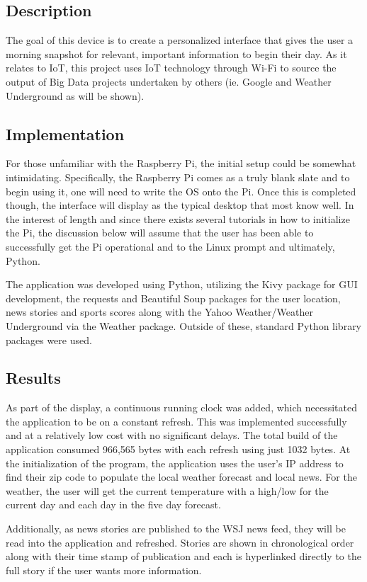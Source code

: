 \documentclass[sigconf]{acmart}
\begin{document}
\subsection{Description}
The goal of this device is to create a personalized interface that gives the user a morning snapshot for relevant, important information to begin their day. As it relates to IoT, this project uses IoT technology through Wi-Fi to source the output of Big Data projects undertaken by others (ie. Google and Weather Underground as will be shown).

\subsection{Implementation}
For those unfamiliar with the Raspberry Pi, the initial setup could be somewhat intimidating. Specifically, the Raspberry Pi comes as a truly blank slate and to begin using it, one will need to write the OS onto the Pi. Once this is completed though, the interface will display as the typical desktop that most know well. In the interest of length and since there exists several tutorials in how to initialize the Pi, the discussion below will assume that the user has been able to successfully get the Pi operational and to the Linux prompt and ultimately, Python.

The application was developed using Python, utilizing the Kivy package for GUI development, the requests and Beautiful Soup packages for the user location, news stories and sports scores along with the  Yahoo Weather/Weather Underground via the Weather package. Outside of these, standard Python library packages were used. 

\subsection{Results}
As part of the display, a continuous running clock was added, which necessitated the application to be on a constant refresh. This was implemented successfully and at a relatively low cost with no significant delays. The total build of the application consumed 966,565 bytes with each refresh using just 1032 bytes. 
At the initialization of the program, the application uses the user's IP address to find their zip code to populate the local weather forecast and local news. For the weather, the user will get the current temperature with a high/low for the current day and each day in the five day forecast.

Additionally, as news stories are published to the WSJ news feed, they will be read into the application and refreshed. Stories are shown in chronological order along with their time stamp of publication and each is hyperlinked directly to the full story if the user wants more information. 
\end{document}
